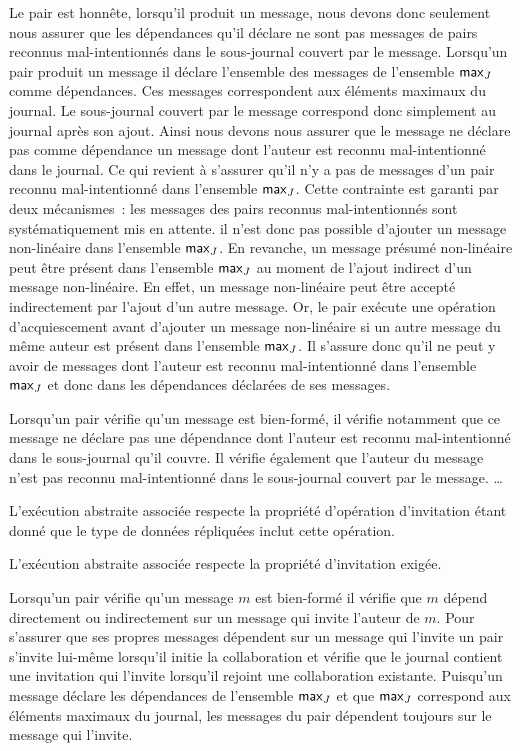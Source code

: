 Le pair est honnête, lorsqu'il produit un message, nous devons donc seulement nous assurer que les dépendances qu'il déclare ne sont pas messages de pairs reconnus mal-intentionnés dans le sous-journal couvert par le message.
Lorsqu'un pair produit un message il déclare l'ensemble des messages de l'ensemble $\operatorname{\mathsf{max}}_J$ comme dépendances.
Ces messages correspondent aux éléments maximaux du journal.
Le sous-journal couvert par le message correspond donc simplement au journal après son ajout.
Ainsi nous devons nous assurer que le message ne déclare pas comme dépendance un message dont l'auteur est reconnu mal-intentionné dans le journal.
Ce qui revient à s'assurer qu'il n'y a pas de messages d'un pair reconnu mal-intentionné dans l'ensemble $\operatorname{\mathsf{max}}_J$.
Cette contrainte est garanti par deux mécanismes~: les messages des pairs reconnus mal-intentionnés sont systématiquement mis en attente.
il n'est donc pas possible d'ajouter un message non-linéaire dans l'ensemble $\operatorname{\mathsf{max}}_J$.
En revanche, un message présumé non-linéaire peut être présent dans l'ensemble $\operatorname{\mathsf{max}}_J$ au moment de l'ajout indirect d'un message non-linéaire.
En effet, un message non-linéaire peut être accepté indirectement par l'ajout d'un autre message.
Or, le pair exécute une opération d'acquiescement avant d'ajouter un message non-linéaire si un autre message du même auteur est présent dans l'ensemble $\operatorname{\mathsf{max}}_J$.
Il s'assure donc qu'il ne peut y avoir de messages dont l'auteur est reconnu mal-intentionné dans l'ensemble $\operatorname{\mathsf{max}}_J$ et donc dans les dépendances déclarées de ses messages.

Lorsqu'un pair vérifie qu'un message est bien-formé, il vérifie notamment que ce message ne déclare pas une dépendance dont l'auteur est reconnu mal-intentionné dans le sous-journal qu'il couvre.
Il vérifie également que l'auteur du message n'est pas reconnu mal-intentionné dans le sous-journal couvert par le message.
\ldots

L'exécution abstraite associée respecte la propriété d'opération d'invitation étant donné que le type de données répliquées inclut cette opération.

L'exécution abstraite associée respecte la propriété d'invitation exigée.

Lorsqu'un pair vérifie qu'un message $m$ est bien-formé il vérifie que $m$ dépend directement ou indirectement sur un message qui invite l'auteur de $m$.
Pour s'assurer que ses propres messages dépendent sur un message qui l'invite un pair s'invite lui-même lorsqu'il initie la collaboration et vérifie que le journal contient une invitation qui l'invite lorsqu'il rejoint une collaboration existante.
Puisqu'un message déclare les dépendances de l'ensemble $\operatorname{\mathsf{max}}_J$ et que $\operatorname{\mathsf{max}}_J$ correspond aux éléments maximaux du journal, les messages du pair dépendent toujours sur le message qui l'invite.

